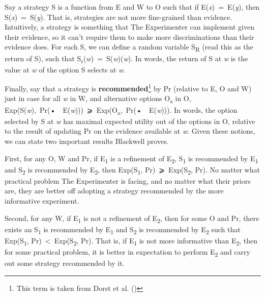 \documentclass[
  10pt,
  letterpaper,
  DIV=11,
  numbers=noendperiod,
  twoside]{scrartcl}
\begin{document}
Say a strategy S is a function from E and W to O such that if
E(\emph{x})~=~E(\emph{y}), then S(\emph{x})~=~S(\emph{y}). That is,
strategies are not more fine-grained than evidence. Intuitively, a
strategy is something that The Experimenter can implement given their
evidence, so it can't require them to make more discriminations than
their evidence does. For each S, we can define a random variable
S\textsubscript{R} (read this as the return of S), such that
S\textsubscript{r}(\emph{w})~=~S(\emph{w})(\emph{w}). In words, the
return of S at \emph{w} is the value at \emph{w} of the option S selects
at \emph{w}.

Finally, say that a strategy is \textbf{recommended}\footnote{This term
  is taken from Dorst et al. ()} by Pr
(relative to E, O and W) just in case for all \emph{w} in W, and
alternative options O\textsubscript{a} in O,
Exp(S(\emph{w}),~Pr(•~\textbar~E(\emph{w})))~⩾~Exp(O\textsubscript{a},~Pr(•~\textbar~E(\emph{w}))).
In words, the option selected by S at \emph{w} has maximal expected
utility out of the options in O, relative to the result of updating Pr
on the evidence available at \emph{w}. Given these notions, we can state
two important results Blackwell proves.

First, for any O, W and Pr, if E\textsubscript{1} is a refinement of
E\textsubscript{2}, S\textsubscript{1} is recommended by
E\textsubscript{1} and S\textsubscript{2} is recommended by
E\textsubscript{2}, then Exp(S\textsubscript{1},
Pr)~⩾~Exp(S\textsubscript{2}, Pr). No matter what practical problem The
Experimenter is facing, and no matter what their priors are, they are
better off adopting a strategy recommended by the more informative
experiment.

Second, for any W, if E\textsubscript{1} is not a refinement of
E\textsubscript{2}, then for some O and Pr, there exists an
S\textsubscript{1} is recommended by E\textsubscript{1} and
S\textsubscript{2} is recommended by E\textsubscript{2} such that
Exp(S\textsubscript{1}, Pr)~\textless~Exp(S\textsubscript{2}, Pr). That
is, if E\textsubscript{1} is not more informative than
E\textsubscript{2}, then for some practical problem, it is better in
expectation to perform E\textsubscript{2} and carry out some strategy
recommended by it.
\end{document}
